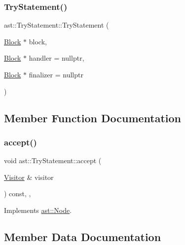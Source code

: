 \subsubsection{\texorpdfstring{Try\+Statement()}{TryStatement()}}
{\footnotesize\ttfamily ast\+::\+Try\+Statement\+::\+Try\+Statement (\begin{DoxyParamCaption}\item[{\hyperlink{structast_1_1_block}{Block} $\ast$}]{block,  }\item[{\hyperlink{structast_1_1_block}{Block} $\ast$}]{handler = {\ttfamily nullptr},  }\item[{\hyperlink{structast_1_1_block}{Block} $\ast$}]{finalizer = {\ttfamily nullptr} }\end{DoxyParamCaption})\hspace{0.3cm}{\ttfamily [inline]}}



\subsection{Member Function Documentation}
\mbox{\label{structast_1_1_try_statement_a849bcb895c040d4e5655935e8c843c1c}} 
\subsubsection{\texorpdfstring{accept()}{accept()}}
{\footnotesize\ttfamily void ast\+::\+Try\+Statement\+::accept (\begin{DoxyParamCaption}\item[{\hyperlink{structast_1_1_visitor}{Visitor} \&}]{visitor }\end{DoxyParamCaption}) const\hspace{0.3cm}{\ttfamily [inline]}, {\ttfamily [override]}, {\ttfamily [virtual]}}



Implements \hyperlink{structast_1_1_node_abc089ee6caaf06a4445ebdd8391fdebc}{ast\+::\+Node}.



\subsection{Member Data Documentation}
\mbox{\label{structast_1_1_try_statement_a9dccbeec8ca4f06ba27991614b8f64ba}} 
